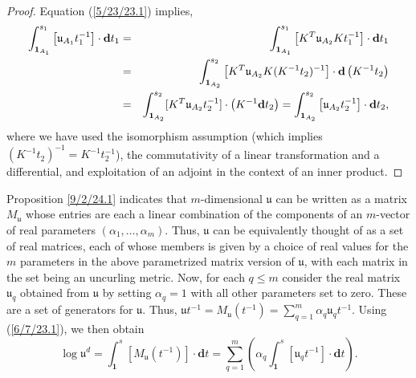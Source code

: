 \documentclass{amsart}
\numberwithin{equation}{section}
\theoremstyle{definition}
\numberwithin{theorem}{section}
\begin{document}
\begin{proof} 
Equation (\ref{5/23/23.1}) implies,
\begin{eqnarray*} \int_{{\bf 1}_{A_1}}^{s_1} \left[\mathfrak{u}_{A_1}t_1^{-1}\right]\cdot \mathbf{d}t_1 &=& \int_{{\bf 1}_{A_1}}^{s_1} \left[ K^T\mathfrak{u}_{A_2}Kt_1^{-1}\right]\cdot \mathbf{d}t_1 \\ &=& 
\int_{{\bf 1}_{A_2}}^{s_2} \left[ K^T\mathfrak{u}_{A_2}K (K^{-1}t_2)^{-1}\right]\cdot \mathbf{d}\left(K^{-1}t_2\right) \\ &=& \int_{{\bf 1}_{A_2}}^{s_2} [K^T\mathfrak{u}_{A_2}t_2^{-1}]\cdot \left(K^{-1}\mathbf{d}t_2\right) = \int_{{\bf 1}_{A_2}}^{s_2} \left[\mathfrak{u}_{A_2}t_2^{-1}\right]\cdot \mathbf{d}t_2, 
\end{eqnarray*} 
where we have used the isomorphism assumption (which implies $(K^{-1}t_2)^{-1} = K^{-1}t_2^{-1}$), the commutativity of a linear transformation and a differential, and exploitation of an adjoint in the context of an inner product.
\end{proof}

Proposition \ref{9/2/24.1} indicates that $m$-dimensional $\mathfrak{u}$ can be written as a matrix $M_\mathfrak{u}$ whose entries are each a linear combination of the components of an $m$-vector of real parameters $(\alpha_1, \dots, \alpha_m)$.   Thus, $\mathfrak{u}$ can be equivalently thought of as a set of real matrices, each of whose members is given by a choice of real values for the $m$ parameters in the above parametrized matrix version of $\mathfrak{u}$, with each matrix in the set being an uncurling metric.  Now, for each $q\le m$ consider the real matrix  $\mathfrak{u}_q$ obtained from $\mathfrak{u}$ by setting $\alpha_q =1$ with all other parameters set to zero.  These are a set of generators for $\mathfrak{u}$. Thus, $\mathfrak{u}t^{-1} = M_{\mathfrak{u}}(t^{-1}) = \sum_{q=1}^m \alpha_q \mathfrak{u}_q t^{-1}$.   Using (\ref{6/7/23.1}), we then obtain \begin{equation}\label{9/26/23.1} \log  \mathfrak{u}^d = \int_{\mathbf{1}}^s [M_{\mathfrak{u}} (t^{-1})]\cdot \mathbf{d}t =\sum_{q=1}^m \left(\alpha_q \int_{\mathbf{1}}^s [\mathfrak{u}_q t^{-1}]\cdot \mathbf{d}t\right).\end{equation}  
\end{document}
